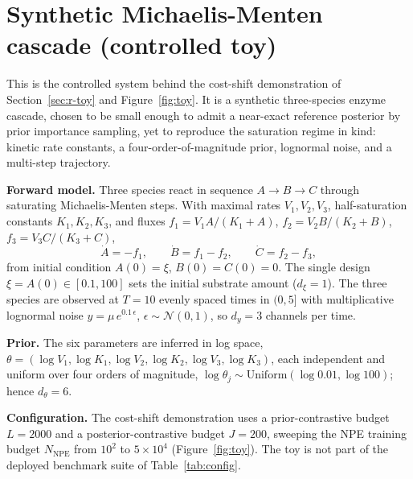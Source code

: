 \section{Synthetic Michaelis-Menten cascade (controlled toy)}
This is the controlled system behind the cost-shift demonstration of
Section~\ref{sec:r-toy} and Figure~\ref{fig:toy}. It is a synthetic three-species enzyme
cascade, chosen to be small enough to admit a near-exact reference posterior by prior
importance sampling, yet to reproduce the saturation regime in kind: kinetic rate
constants, a four-order-of-magnitude prior, lognormal noise, and a multi-step trajectory.

\textbf{Forward model.} Three species react in sequence $A\to B\to C$ through saturating
Michaelis-Menten steps. With maximal rates $V_1,V_2,V_3$, half-saturation constants
$K_1,K_2,K_3$, and fluxes $f_1=V_1A/(K_1+A)$, $f_2=V_2B/(K_2+B)$, $f_3=V_3C/(K_3+C)$,
\[
\dot A=-f_1,\qquad \dot B=f_1-f_2,\qquad \dot C=f_2-f_3,
\]
from initial condition $A(0)=\xi$, $B(0)=C(0)=0$. The single design $\xi=A(0)\in[0.1,100]$
sets the initial substrate amount ($d_\xi=1$). The three species are observed at $T=10$
evenly spaced times in $(0,5]$ with multiplicative lognormal noise
$y=\mu\,e^{0.1\,\epsilon}$, $\epsilon\sim\mathcal N(0,1)$, so $d_y=3$ channels per time.

\textbf{Prior.} The six parameters are inferred in log space, $\theta=(\log V_1,\log K_1,
\log V_2,\log K_2,\log V_3,\log K_3)$, each independent and uniform over four orders of
magnitude, $\log\theta_j\sim\mathrm{Uniform}(\log 0.01,\log 100)$; hence $d_\theta=6$.

\textbf{Configuration.} The cost-shift demonstration uses a prior-contrastive budget
$L=2000$ and a posterior-contrastive budget $J=200$, sweeping the NPE training budget
$N_{\mathrm{NPE}}$ from $10^2$ to $5\times10^4$ (Figure~\ref{fig:toy}). The toy is not part
of the deployed benchmark suite of Table~\ref{tab:config}.

